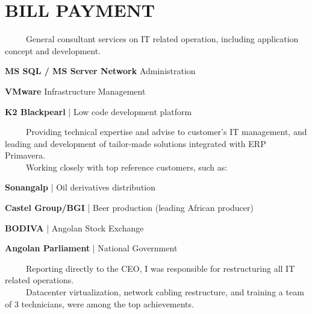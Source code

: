 \documentclass[letterpaper]{deedy-resume} %
\begin{document}
\begin{minipage}[t]{0.66\textwidth}

\section{BILL PAYMENT}


\-\	\ \ \ \ General consultant services on IT related operation, including application concept and development. \\
\vspace{\topsep}
\begin{tightitemize}
	\item \textbf{MS SQL / MS Server Network} Administration
	\item \textbf{VMware} Infrastructure Management
	\item \textbf{K2 Blackpearl} | Low code development platform
\end{tightitemize}


\-\	\ \ \ \ Providing technical expertise and advise to customer's IT management, and leading and development of tailor-made solutions integrated with ERP Primavera.\\
\-\	\ \ \ \ Working closely with top reference customers, such as:\\
\begin{tightitemize}
	\item \textbf{Sonangalp} | Oil derivatives distribution
	\item \textbf{Castel Group/BGI} | Beer production (leading African producer)
	\item \textbf{BODIVA} | Angolan Stock Exchange
	\item \textbf{Angolan Parliament} | National Government
\end{tightitemize}

\sectionspace


\-\	\ \ \ \ Reporting directly to the CEO, I was responsible for restructuring all IT related operations.\\
\-\	\ \ \ \ Datacenter virtualization, network cabling restructure, and training a team of 3 technicians, were among the top achievements.\\


\end{minipage}
\end{document}
